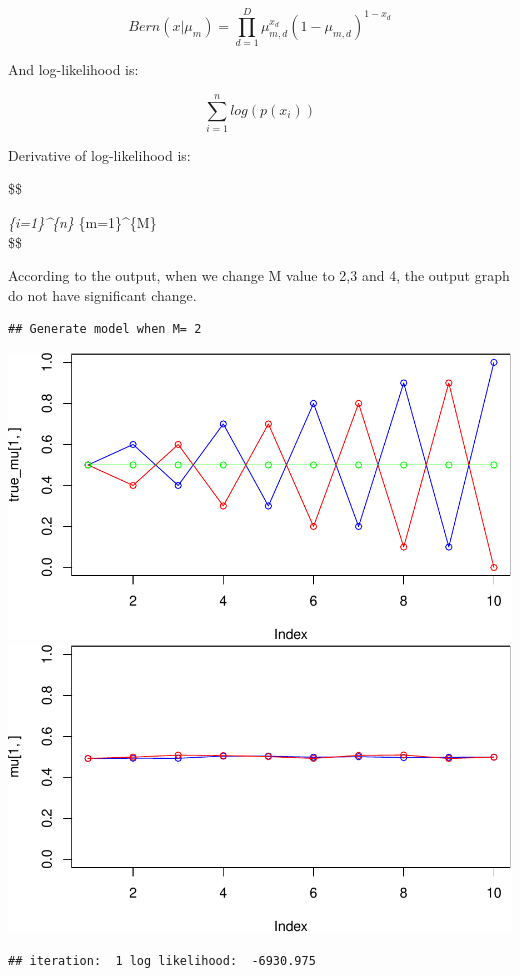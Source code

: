 \documentclass[
]{article}
\begin{document}
\[
Bern(x|\mu_{m}) = \prod_{d=1}^{D} \mu_{m,d}^{x_{d}}(1-\mu_{m,d})^{1-x_{d}}
\]

And log-likelihood is:

\[
\sum_{i=1}^{n}log(p(x_{i}))
\]

Derivative of log-likelihood is:

\$\$

\sum\emph{\{i=1\}\^{}\{n\} \sum}\{m=1\}\^{}\{M\}\\
\$\$

According to the output, when we change M value to 2,3 and 4, the output
graph do not have significant change.

\begin{verbatim}
## Generate model when M= 2
\end{verbatim}

\includegraphics{Lab1Block2_files/figure-latex/unnamed-chunk-1-1.pdf}
\includegraphics{Lab1Block2_files/figure-latex/unnamed-chunk-1-2.pdf}

\begin{verbatim}
## iteration:  1 log likelihood:  -6930.975
\end{verbatim}
\end{document}
